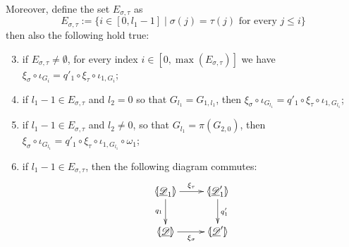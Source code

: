 \begin{lemma}
	Moreover, define the set $E_{\sigma, \tau}$ as
	\[E_{\sigma, \tau}:=\{i\in  [0, l_1-1] \mid \sigma(j)=\tau(j) \text{ for every } j \leq i \}\]
	then also the following hold true:
	\begin{enumerate}
		\setcounter{enumi}{2}
	\item  if $E_{\sigma, \tau}\neq \emptyset$,  for every index $i\in [0, \max(E_{\sigma, \tau})]$ we have 
	$\xi_\sigma \circ \iota_{G_i}=q'_1 \circ \xi_{\tau} \circ \iota_{1, G_i}$;
	\item if $l_1-1\in E_{\sigma, \tau}$ and $l_2=0$ so that  $G_{l_1}=G_{1, l_1}$, then 
	$\xi_\sigma \circ \iota_{G_{l_1}}=q'_1 \circ \xi_{\tau} \circ \iota_{1, G_{l_1}}$;
	\item if $l_1-1\in E_{\sigma, \tau}$ and $l_2\neq 0$, so that $G_{l_1}=\pi(G_{2,0})$, then 
	$\xi_\sigma \circ \iota_{G_{l_1}}=q'_1 \circ \xi_{\tau} \circ \iota_{1, G_{l_1}}\circ \omega_1$;
	\item if $l_1-1\in E_{\sigma, \tau}$, then the following diagram commutes:
	\[\xymatrix{\lpro \der{D}_1\rpro \ar[r]^{\xi_\tau} \ar[d]_{q_1}& \lpro \der{D}'_1 \ar[d]^{q'_1}\rpro\\ \lpro \der{D}\rpro \ar[r]_{\xi_\sigma} & \lpro \der{D}'\rpro } \]
	\end{enumerate}
\end{lemma}
